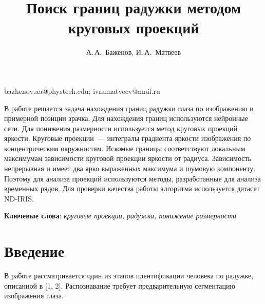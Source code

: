 \documentclass[12pt, twoside]{article}
\begin{document}
\title
    {Поиск границ радужки методом круговых проекций} %
\author
    {А.\,А.~Баженов, И.\,А.~Матвеев} %
\email
    {bazhenov.aa@phystech.edu; ivanmatveev@mail.ru}
\abstract
    {В работе решается задача нахождения границ радужки глаза по  изображению и примерной позиции зрачка. Для нахождения границ используются нейронные сети. Для понижения размерности используется метод круговых проекций яркости. Круговые проекции~--- интегралы градиента яркости изображения по концентрическим окружностям. Искомые границы соответствуют локальным максимумам зависимости круговой проекции яркости от радиуса. Зависимость непрерывная и имеет два ярко выраженных максимума и шумовую компоненту. Поэтому для анализа проекций используются методы, разработанные для анализа временных рядов. Для проверки качества работы алгоритма используется датасет ND-IRIS.
	
\bigskip
\noindent
\textbf{Ключевые слова}: \emph {круговые проекции, радужка, понижение размерности}

}


\maketitle
\linenumbers

\section{Введение}
В работе рассматривается один из этапов идентификации человека по радужке, описанной в [1, 2]. Распознавание требует предварительную сегментацию изображения глаза.
\end{document}
